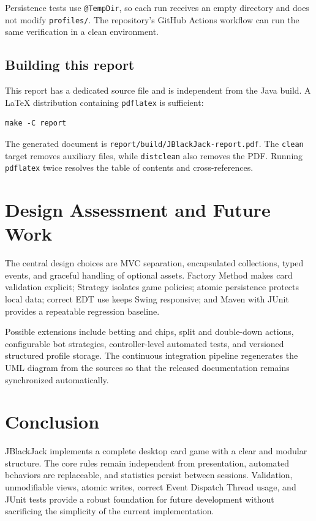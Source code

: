 \documentclass[11pt,a4paper]{report}
\newcommand{\code}[1]{\nolinkurl{#1}}
\begin{document}
Persistence tests use \code{@TempDir}, so each run receives an empty directory and
does not modify \code{profiles/}. The repository's GitHub Actions workflow can run the
same verification in a clean environment.

\section{Building this report}

This report has a dedicated source file and is independent from the Java build. A
LaTeX distribution containing \code{pdflatex} is sufficient:

\begin{verbatim}
make -C report
\end{verbatim}

The generated document is \code{report/build/JBlackJack-report.pdf}. The
\code{clean} target removes auxiliary files, while \code{distclean} also removes the
PDF. Running \code{pdflatex} twice resolves the table of contents and cross-references.

\chapter{Design Assessment and Future Work}

The central design choices are MVC separation, encapsulated collections, typed events,
and graceful handling of optional assets. Factory Method makes card validation explicit;
Strategy isolates game policies; atomic persistence protects local data; correct EDT use
keeps Swing responsive; and Maven with JUnit provides a repeatable regression baseline.

Possible extensions include betting and chips, split and double-down actions,
configurable bot strategies, controller-level automated tests, and versioned structured
profile storage. The continuous integration pipeline regenerates the UML diagram from
the sources so that the released documentation remains synchronized automatically.

\chapter*{Conclusion}

JBlackJack implements a complete desktop card game with a clear and modular structure.
The core rules remain independent from presentation, automated behaviors are
replaceable, and statistics persist between sessions. Validation, unmodifiable views,
atomic writes, correct Event Dispatch Thread usage, and JUnit tests provide a robust
foundation for future development without sacrificing the simplicity of the current
implementation.
\end{document}
